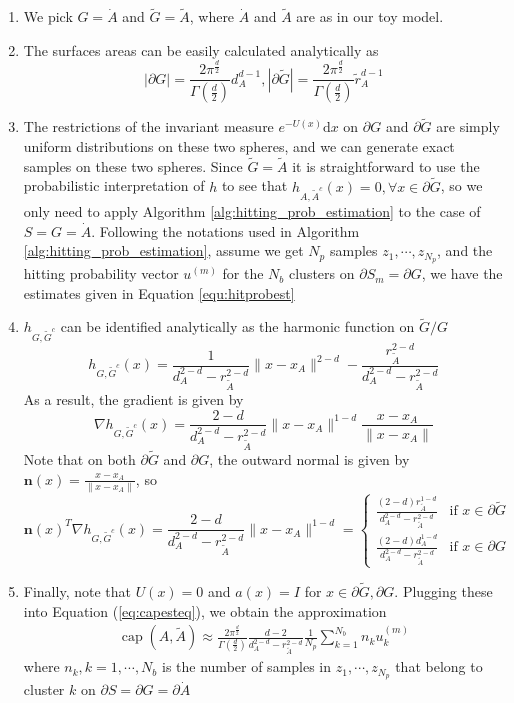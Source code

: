 \documentclass[english, aip, jcp, priprint, graphicx,floatfix]{revtex4-1}
\theoremstyle{plain}
\theoremstyle{definition}
\theoremstyle{plain}
\begin{document}
\begin{enumerate}
	\item We pick $G = \dot{A}$ and $\tilde{G} = \tilde{A}$, where $\dot{A}$ and $\tilde{A}$ are as in our toy model.
	\item The surfaces areas can be easily calculated analytically as
\[|\partial G| = \frac{2\pi^{\frac{d}{2}}}{\Gamma(\frac{d}{2})}d_A^{d - 1}, |\partial \tilde{G}| = \frac{2\pi^{\frac{d}{2}}}{\Gamma(\frac{d}{2})}\tilde{r}_A^{d - 1}\]
	\item The restrictions of the invariant measure $e^{- U (x)} \mathrm{d} x$ on $\partial G$ and $\partial \tilde{G}$ are simply uniform distributions on these two spheres, and we can generate exact samples on these two spheres. Since $\tilde{G} = \tilde{A}$ it is straightforward to use the probabilistic interpretation of $h$ to see that $h_{A, \tilde{A}^c} (x) = 0, \forall x \in \partial \tilde{G}$, so we only need to apply Algorithm \ref{alg:hitting_prob_estimation} to the case of $S=G=\dot{A}$. Following the notations used in Algorithm \ref{alg:hitting_prob_estimation}, assume we get $N_p$ samples $z_1,\cdots, z_{N_p}$, and the hitting probability vector $u^{(m)}$ for the $N_b$ clusters on $\partial S_m = \partial G$, we have the estimates given in Equation \ref{equ:hitprobest}
	\item $h_{G, \tilde{G}^c}$ can be identified analytically as the harmonic function on $\tilde{G} / G$\cite{Wendel1980-sj}
\[ h_{G, \tilde{G}^c} (x) = \frac{1}{d_A^{2 - d} - r_{\tilde{A}}^{2 - d}} \| x
- x_A \|^{2 - d} - \frac{r_{\tilde{A}}^{2 - d}}{d_A^{2 - d} -
r_{\tilde{A}}^{2 - d}} \]
As a result, the gradient is given by
\[ \nabla h_{G, \tilde{G}^c} (x) = \frac{2 - d}{d_A^{2 - d} - r_{\tilde{A}}^{2
   - d}} \| x - x_A \|^{1 - d} \frac{x - x_A}{\| x - x_A \|} \]
Note that on both $\partial \tilde{G}$ and $\partial G$, the outward normal is
given by ${\textbf{n}} (x) = \frac{x - x_A}{\| x - x_A \|}$, so
\[
	{\textbf{n}} (x)^T \nabla h_{G, \tilde{G}^c} (x) = \frac{2 - d}{d_A^{2 - d} - r_{\tilde{A}}^{2 - d}} \| x - x_A \|^{1 - d} = 
\begin{cases}
	\frac{(2 - d) r_{\tilde{A}}^{1 - d}}{d_A^{2 - d} - r_{\tilde{A}}^{2 - d}} & \text{if }x \in \partial \tilde{G}\\
	\frac{(2 - d) d_A^{1 - d}}{d_A^{2 - d} - r_{\tilde{A}}^{2 - d}} & \text{if }x \in \partial G
\end{cases}
\]
\item Finally, note that $U (x) = 0$ and $a (x) = I$ for $x
\in \partial \tilde{G},\partial G$.  Plugging these into Equation (\ref{eq:capesteq}), we obtain the approximation
%
\begin{gather}
	\ensuremath{\operatorname{cap}} (A, \tilde{A}) \approx \frac{2\pi^{\frac{d}{2}}}{\Gamma(\frac{d}{2})}\frac{d-2}{d_A^{2-d}-r_{\tilde A}^{2-d}}\frac{1}{N_p} \sum_{k=1}^{N_b}n_k u_k^{(m)}
\end{gather}
where $n_k, k=1, \cdots, N_b$ is the number of samples in $z_1, \cdots, z_{N_p}$ that belong to cluster $k$ on $\partial S=\partial G=\partial \dot{A}$
%
\end{enumerate}
\end{document}
